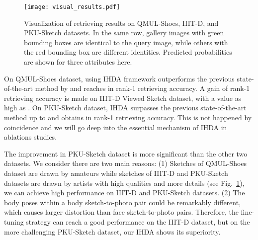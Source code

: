 \documentclass[journal]{IEEEtran}
\begin{document}
\tabcolsep=4pt
\begin{table}[!ht]
\centering
\caption{The performance of sketch-to-photo retrieval on the PKU-Sketch dataset.}
\label{t:results_PKU-Sketch}
\end{table}

\begin{figure}[!htb]
\centering
  \texttt{[image: visual\_results.pdf]}
  \caption{Visualization of retrieving results on QMUL-Shoes, IIIT-D, and PKU-Sketch datasets. In the same row, gallery images with green bounding boxes are identical to the query image, while others with the red bounding box are different identities. Predicted probabilities are shown for three attributes here.}
  \label{fig:visual}
\end{figure}

On QMUL-Shoes dataset, using IHDA framework outperforms the previous state-of-the-art method by  and reaches  in rank-1 retrieving accuracy. A  gain of rank-1 retrieving accuracy is made on IIIT-D Viewed Sketch dataset, with a value as high as . On PKU-Sketch dataset, IHDA surpasses the previous state-of-the-art method up to  and obtains  in rank-1 retrieving accuracy. This is not happened by coincidence and we will go deep into the essential mechanism of IHDA in ablations studies.

The improvement in PKU-Sketch dataset is more significant than the other two datasets. We consider there are two main reasons: (1) Sketches of QMUL-Shoes dataset are drawn by amateurs while sketches of IIIT-D and PKU-Sketch datasets are drawn by artists with high qualities and more details (see Fig.~\ref{fig:visual}), we can achieve high performance on IIIT-D and PKU-Sketch datasets. (2) The body poses within a body sketch-to-photo pair could be remarkably different, which causes larger distortion than face sketch-to-photo pairs. Therefore, the fine-tuning strategy can reach a good performance on the IIIT-D dataset, but on the more challenging PKU-Sketch dataset, our IHDA shows its superiority.
\end{document}
